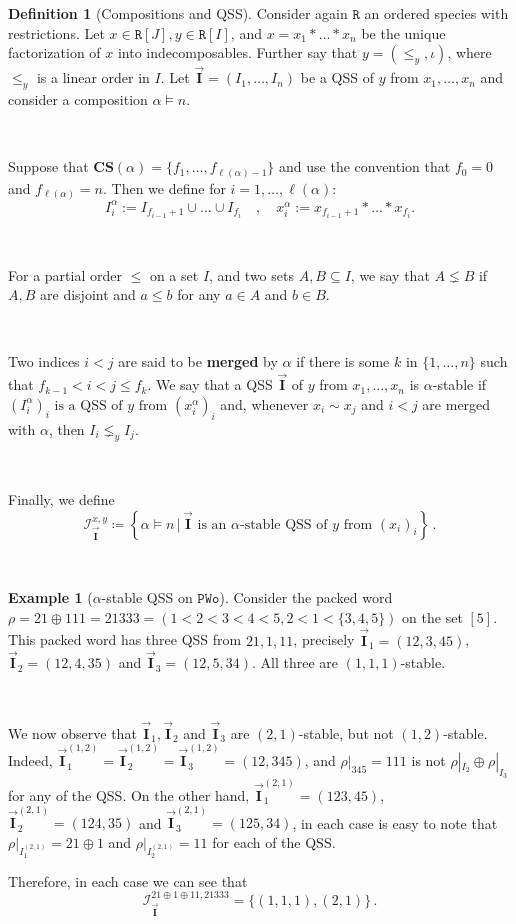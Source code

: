 \documentclass[12pt, reqno]{amsart}
\theoremstyle{definition}
\newtheorem{defin}[thm]{Definition}
\newtheorem{smpl}[thm]{Example}
\newcommand{\III}{\vec{\mathbf{I}}}
\begin{document}
\begin{defin}[Compositions and QSS]
Consider again $\mathtt{R}$ an ordered species with restrictions.
Let $x \in \mathtt{R}[J], y \in  \mathtt{R}[I]$, and $x = x_1\ast \dots \ast x_n$ be the unique factorization of $x$ into indecomposables.
Further say that $y = (\leq_y, \iota)$, where $\leq_y$ is a linear order in $I$.
Let $\III = (I_1, \dots , I_n)$ be a QSS of $y$ from $x_1, \dots, x_n$ and consider a composition $\alpha \models n$.

\

Suppose that $ \mathbf{CS} (\alpha) = \{f_1, \dots, f_{\ell(\alpha) - 1} \}$ and use the convention that $f_0 = 0$ and $f_{\ell(\alpha)} = n$. 
Then we define for $i = 1, \dots, \ell(\alpha)$:
\[I^{\alpha}_i := I_{f_{i-1} + 1} \cup \dots \cup I_{f_i} \quad , \quad x^{\alpha}_i := x_{f_{i-1} + 1} \ast \dots \ast x_{f_i}.\]

\

For a partial order $\leq$ on a set $I$, and two sets $A, B \subseteq I$, we say that $A \lneq B$ if $A, B$ are disjoint and $a \leq b$ for any $a \in A$ and $b \in B$.

\

Two indices $i< j$ are said to be \textbf{merged} by $\alpha$ if there is some $k$ in $\{1, \dots, n\}$ such that $ f_{k-1} < i < j \leq f_k$.
We say that a QSS $\III$ of $y$ from $x_1, \dots , x_n$ is $\alpha $-stable if $(I^{\alpha}_i)_i \text{ is a QSS of $y$ from } (x^{\alpha}_i)_i$ and, whenever $x_i \sim x_j$ and $i < j$ are merged with $\alpha $, then $I_i \lneq_y I_j$.

\

Finally, we define 
\begin{equation}
   \mathcal I^{x, y}_{\III} \coloneqq \left\{ \alpha \models n \,\Big| \,\III \text{ is an $\alpha$-stable QSS of $y$ from } (x_i)_i \right\} \, . 
\end{equation}
\end{defin}

\

\begin{smpl}[$\alpha$-stable QSS on $\mathtt{PWo}$]
Consider the packed word $\rho = 21 \oplus 111 = 21333 = (1 < 2 < 3 < 4 < 5, 2 < 1 < \{3, 4, 5\})$ on the set $[5]$.
This packed word has three QSS from $21, 1, 11$, precisely $\III_1 =(12, 3, 45)$, $\III_2 =(12, 4, 35)$ and $\III_3 =(12, 5, 34)$.
All three are $(1, 1, 1)$-stable.

\

We now observe that $\III_1, \III_2$ and $\III_3$ are $(2, 1)$-stable, but not $(1, 2)$-stable.
Indeed, $\III_1^{(1, 2)} = \III_2^{(1, 2)} = \III_3^{(1, 2)} = (12, 345)$, and $\rho|_{345} = 111$ is not $\rho|_{I_2} \oplus \rho|_{I_3}$ for any of the QSS.
On the other hand, $\III_1^{(2, 1)} = (123, 45)$, $\III_2^{(2, 1)} = (124, 35)$ and $\III_3^{(2, 1)} = (125, 34)$, in each case is easy to note that $\rho|_{I_1^{(2, 1)}} = 21\oplus 1$ and $\rho|_{I_2^{(2, 1)}} = 11$ for each of the QSS.

Therefore, in each case we can see that
$$\mathcal I_{\III}^{21\oplus 1\oplus 11, 21333} = \{(1, 1, 1), (2, 1)\}\, . $$
\end{smpl}
\end{document}
